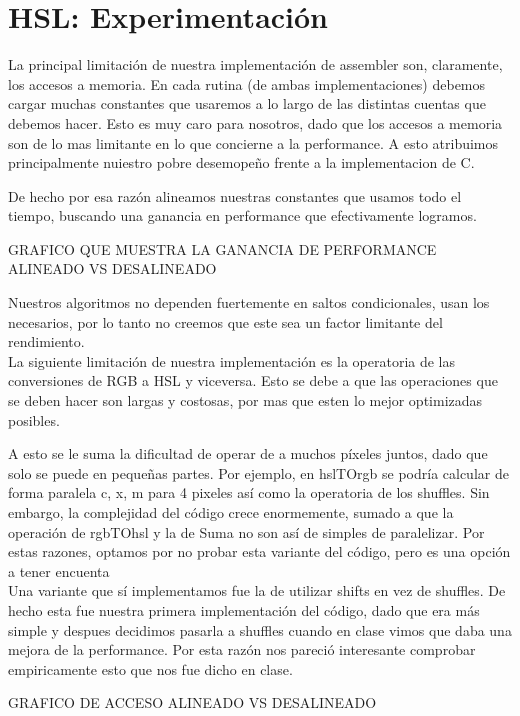 \section*{HSL: Experimentación}

La principal limitación de nuestra implementación de assembler son, claramente, los accesos a memoria. En cada rutina (de ambas implementaciones) debemos cargar muchas constantes que usaremos a lo largo de las distintas cuentas que debemos hacer.
Esto es muy caro para nosotros, dado que los accesos a memoria son de lo mas limitante en lo que concierne a la performance. 
A esto atribuimos principalmente nuiestro pobre desemopeño frente a la implementacion de C.

De hecho por esa razón alineamos nuestras constantes que usamos todo el tiempo, buscando una ganancia en performance que efectivamente logramos.

GRAFICO QUE MUESTRA LA GANANCIA DE PERFORMANCE ALINEADO VS DESALINEADO

Nuestros algoritmos no dependen fuertemente en saltos condicionales, usan los necesarios, por lo tanto no creemos que este sea un factor limitante del rendimiento.
\\

La siguiente limitación de nuestra implementación es la operatoria de las conversiones de RGB a HSL y viceversa. Esto se debe a que las operaciones que se deben hacer son largas y costosas, por mas que esten lo mejor optimizadas posibles.

A esto se le suma la dificultad de operar de a muchos píxeles juntos, dado que solo se puede en pequeñas partes.
Por ejemplo, en hslTOrgb se podría calcular de forma paralela c, x, m para 4 pixeles así como la operatoria de los shuffles.
Sin embargo, la complejidad del código crece enormemente, sumado a que la operación de rgbTOhsl y la de Suma no son así de simples de paralelizar.
Por estas razones, optamos por no probar esta variante del código, pero es una opción a tener encuenta
\\

Una variante que sí implementamos fue la de utilizar shifts en vez de shuffles. De hecho esta fue nuestra primera implementación del código, dado que era más simple y despues decidimos pasarla a shuffles cuando en clase vimos que daba una mejora de la performance. Por esta razón nos pareció interesante comprobar empiricamente esto que nos fue dicho en clase.

GRAFICO DE ACCESO ALINEADO VS DESALINEADO






